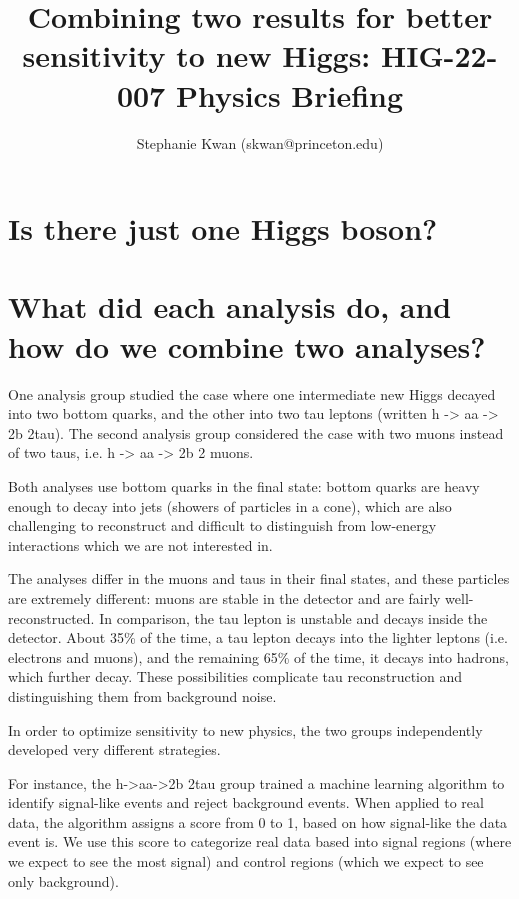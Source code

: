 \documentclass{article}
\title{Combining two results for better sensitivity to new Higgs: HIG-22-007 Physics Briefing}
\author{Stephanie Kwan (skwan@princeton.edu)}
\begin{document}
\maketitle


\section{Is there just one Higgs boson?}



\section{What did each analysis do, and how do we combine two analyses?}

One analysis group studied the case where one intermediate new Higgs decayed into two bottom quarks, and the other into two tau leptons (written h -> aa -> 2b 2tau).
The second analysis group considered the case with two muons instead of two taus, i.e. h -> aa -> 2b 2 muons. 

Both analyses use bottom quarks in the final state: bottom quarks are heavy enough to decay into jets (showers of particles in a cone), which are also challenging to reconstruct
and difficult to distinguish from low-energy interactions which we are not interested in.

The analyses differ in the muons and taus in their final states, and these particles are extremely different: muons are stable in the detector and are fairly well-reconstructed. 
In comparison, the tau lepton is unstable and decays inside the detector. About 35\% of the time, a tau lepton decays into the lighter leptons (i.e. electrons and muons), and the remaining 65\% of the time, it decays into hadrons, 
which further decay. These possibilities complicate tau reconstruction and distinguishing them from background noise. 

In order to optimize sensitivity to new physics, the two groups independently developed very different strategies.

For instance, the h->aa->2b 2tau group trained a machine learning algorithm to identify signal-like events and reject background events. When applied to real data, the algorithm assigns a score from 0 to 1, 
based on how signal-like the data event is. We use this score to categorize real data based into signal regions (where we expect to see the most signal) and control regions (which we expect to see only background). 
\end{document}

